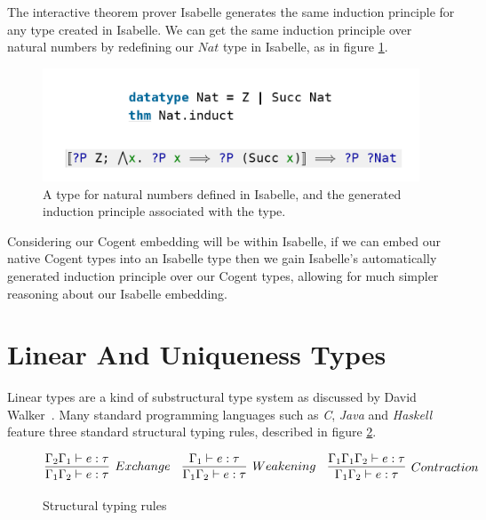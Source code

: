 The interactive theorem prover Isabelle generates the same induction principle for any type created in
Isabelle. We can get the same induction principle over natural numbers by redefining our $Nat$
type in Isabelle, as in figure \ref{fig:IsabelleNatInduct}.

\begin{center}
    \begin{figure}
        \includegraphics[width=\linewidth]{content/isabelleNatInduct.png}
        \caption{A type for natural numbers defined in Isabelle, and the generated 
        induction principle associated with the type.}
        \label{fig:IsabelleNatInduct}
    \end{figure}
\end{center}

\FloatBarrier

Considering our Cogent embedding will be within Isabelle, if we can embed our native
Cogent types into an Isabelle type then we gain Isabelle's automatically generated
induction principle over our Cogent types, allowing for much 
simpler reasoning about our Isabelle embedding.

\section{Linear And Uniqueness Types}

Linear types are a kind of substructural type system as discussed by\newline{} David Walker~\citep{Substructural}.
Many standard programming languages such as \textit{C}, \textit{Java} and \textit{Haskell} feature
three standard structural typing rules, described in figure \ref{def:structural}.

\begin{figure}
    \centering
    $$
        \infer[Exchange]{
            \Gamma_1\Gamma_2 \vdash e : \tau
        }{
            \Gamma_2\Gamma_1 \vdash e : \tau
        }\quad
        \infer[Weakening]{
            \Gamma_1\Gamma_2 \vdash e : \tau
        }{
            \Gamma_1 \vdash e : \tau
        }\quad
        \infer[Contraction]{
            \Gamma_1\Gamma_2 \vdash e : \tau
        }{
            \Gamma_1\Gamma_1\Gamma_2 \vdash e : \tau
        }
    $$
    \caption{Structural typing rules}
    \label{def:structural}
\end{figure}

